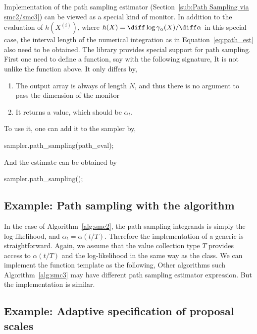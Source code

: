 Implementation of the path sampling estimator (Section~\ref{sub:Path Sampling
  via smc2/smc3}) can be viewed as a special kind of monitor. In addition to
the evaluation of $h(X^{(i)})$, where $h(X) =
\diff\log\gamma_{\alpha}(X)/\diff\alpha$ in this special case, the interval
length of the numerical integration as in Equation~\eqref{eq:path_est} also
need to be obtained. The \vsmc library provides special support for path
sampling. First one need to define a function, say  with
the following signature,
It is not unlike the  function above. It only differs
by,
\begin{enumerate}
  \item The output array  is always of length $N$, and thus
    there is no argument to pass the dimension of the monitor
  \item It returns a value, which should be $\alpha_t$.
\end{enumerate}
To use it, one can add it to the sampler by,
\begin{cppcode}
sampler.path_sampling(path_eval);
\end{cppcode}
And the estimate can be obtained by
\begin{cppcode}
sampler.path_sampling();
\end{cppcode}

\subsection{Example: Path sampling with the \smc[2] algorithm}
\label{sub:Example: Path sampling with the SMC2 algorithm}

In the case of Algorithm~\ref{alg:smc2}, the path sampling integrands is
simply the log-likelihood, and $\alpha_t = \alpha(t/T)$. Therefore the
implementation of a generic  is straightforward. Again,
we assume that the value collection type $T$ provides access to $\alpha(t/T)$
and the log-likelihood in the same way as the  class. We can
implement the function template as the following,
Other \smc algorithms such Algorithm~\ref{alg:smc3} may have different path
sampling estimator expression. But the implementation is similar.

\subsection{Example: Adaptive specification of proposal scales}
\label{sub:Example: Adaptive specification of proposal scales}

